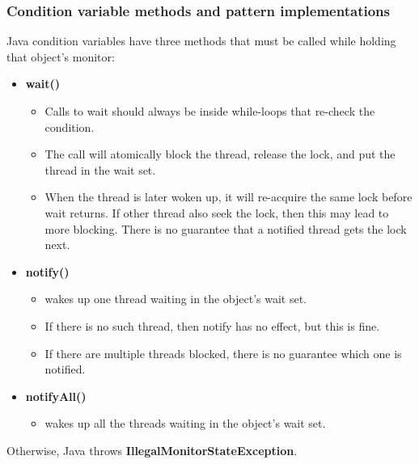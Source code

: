 \documentclass[11pt]{article}
\begin{document}
\subsubsection{Condition variable methods and pattern implementations}
Java condition variables have three methods that must be called while holding that object's monitor:
\begin{itemize}
    \item \textbf{wait()}
    \begin{itemize}
        \item Calls to wait should always be inside while-loops that re-check the condition.
        \item The call will atomically block the thread, release the lock, and put the thread in the wait set.
        \item When the thread is later woken up, it will re-acquire the same lock before wait returns. If other thread also seek the lock, then this may lead to more blocking. There is no guarantee that a notified thread gets the lock next.
    \end{itemize}
    \item \textbf{notify()}
    \begin{itemize}
        \item wakes up one thread waiting in the object's wait set.
        \item If there is no such thread, then notify has no effect, but this is fine.
        \item If there are multiple threads blocked, there is no guarantee which one is notified.
    \end{itemize}
    \item \textbf{notifyAll()}
    \begin{itemize}
        \item wakes up all the threads waiting in the object's wait set.
    \end{itemize}
\end{itemize}
Otherwise, Java throws \textbf{IllegalMonitorStateException}.
\end{document}
